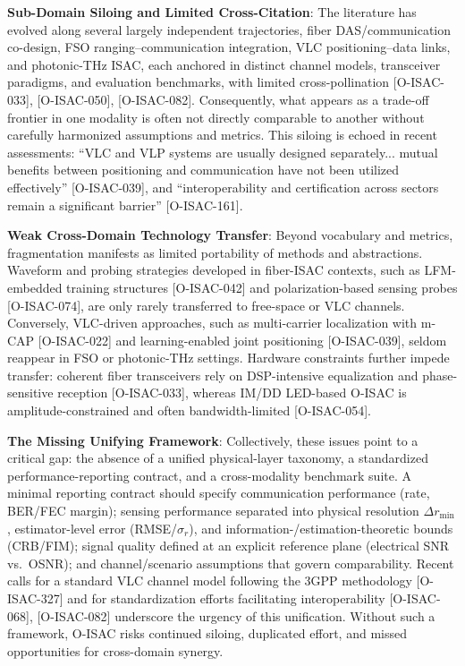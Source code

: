 \textbf{Sub-Domain Siloing and Limited Cross-Citation}: The literature has evolved along several largely independent trajectories, fiber DAS/communication co-design, FSO ranging--communication integration, VLC positioning--data links, and photonic-THz ISAC, each anchored in distinct channel models, transceiver paradigms, and evaluation benchmarks, with limited cross-pollination [O-ISAC-033], [O-ISAC-050], [O-ISAC-082]. Consequently, what appears as a trade-off frontier in one modality is often not directly comparable to another without carefully harmonized assumptions and metrics. This siloing is echoed in recent assessments: ``VLC and VLP systems are usually designed separately... mutual benefits between positioning and communication have not been utilized effectively'' [O-ISAC-039], and ``interoperability and certification across sectors remain a significant barrier'' [O-ISAC-161].

\textbf{Weak Cross-Domain Technology Transfer}: Beyond vocabulary and metrics, fragmentation manifests as limited portability of methods and abstractions. Waveform and probing strategies developed in fiber-ISAC contexts, such as LFM-embedded training structures [O-ISAC-042] and polarization-based sensing probes [O-ISAC-074], are only rarely transferred to free-space or VLC channels. Conversely, VLC-driven approaches, such as multi-carrier localization with m-CAP [O-ISAC-022] and learning-enabled joint positioning [O-ISAC-039], seldom reappear in FSO or photonic-THz settings. Hardware constraints further impede transfer: coherent fiber transceivers rely on DSP-intensive equalization and phase-sensitive reception [O-ISAC-033], whereas IM/DD LED-based O-ISAC is amplitude-constrained and often bandwidth-limited [O-ISAC-054].

\textbf{The Missing Unifying Framework}: Collectively, these issues point to a critical gap: the absence of a unified physical-layer taxonomy, a standardized performance-reporting contract, and a cross-modality benchmark suite. A minimal reporting contract should specify communication performance (rate, BER/FEC margin); sensing performance separated into physical resolution $\Delta r_{\min}$, estimator-level error (RMSE/$\sigma_r$), and information-/estimation-theoretic bounds (CRB/FIM); signal quality defined at an explicit reference plane (electrical SNR vs.\ OSNR); and channel/scenario assumptions that govern comparability. Recent calls for a standard VLC channel model following the 3GPP methodology [O-ISAC-327] and for standardization efforts facilitating interoperability [O-ISAC-068], [O-ISAC-082] underscore the urgency of this unification. Without such a framework, O-ISAC risks continued siloing, duplicated effort, and missed opportunities for cross-domain synergy.

